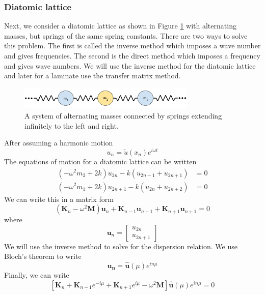 \documentclass{article}
\begin{document}
\subsubsection{Diatomic lattice}
Next, we consider a diatomic lattice as shown in Figure \ref{fig:dms} with 
alternating masses, but springs of the same spring constants. There are two 
ways to solve this problem. The first is called the inverse method which 
imposes a wave number and gives frequencies. The second is the 
direct method which imposes a frequency and gives wave numbers. We will use the 
inverse method for the diatomic lattice and later for a laminate use the 
transfer matrix method.
\begin{figure}[!htbp]
	\centering
	\includegraphics[width=0.75\textwidth]{diatomic-mass-spring.pdf}
	\caption{A system of alternating masses connected by springs extending 
	infinitely to the left and right.}
	\label{fig:dms}
\end{figure}
After assuming a harmonic motion
\begin{equation}
u_n = \tilde{u}(x_n)e^{i\omega t}
\end{equation}
The equations of motion for a diatomic lattice can be written
\begin{align}
	(-\omega^2m_2 + 2k)u_{2n} - k(u_{2n-1} + u_{2n+1}) &= 0 \\
	(-\omega^2m_1 + 2k)u_{2n+1} - k(u_{2n} + u_{2n+2}) &= 0
\end{align}
We can write this in a matrix form
\begin{equation}
(\mathbf{K}_n - \omega^2 \mathbf{M})\mathbf{u}_n + 
\mathbf{K}_{n-1}\mathbf{u}_{n-1}
+ \mathbf{K}_{n+1}\mathbf{u}_{n+1} = 0
\end{equation}
where
\begin{equation}
\mathbf{u}_n =
\begin{bmatrix}
u_{2n} \\
u_{2n+1}
\end{bmatrix}
\end{equation}
We will use the inverse method to solve for the dispersion relation. We use 
Bloch's theorem to write
\begin{equation}
\mathbf{u_n}= \mathbf{\hat{u}}(\mu)e^{in\mu}
\end{equation}
Finally, we can write
\begin{equation}
\left[\mathbf{K}_n + \mathbf{K}_{n-1}e^{-i\mu} + \mathbf{K}_{n+1}e^{i\mu} 
-\omega^2 \mathbf{M} \right] \mathbf{\hat{u}}(\mu)e^{in\mu} = 0
\end{equation}
\end{document}
